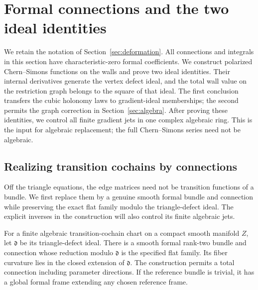 \section{Formal connections and the two ideal identities}
\label{sec:connections}

We retain the notation of Section~\ref{sec:deformation}.  All
connections and integrals in this section have characteristic-zero
formal coefficients.  We construct polarized Chern--Simons functions
on the walls and prove two ideal identities.  Their internal derivatives generate
the vertex defect ideal, and the total wall value on the restriction
graph belongs to the square of that ideal. The first conclusion
transfers the cubic holonomy laws to gradient-ideal memberships; the
second permits the graph correction in Section~\ref{sec:algebra}.
After proving these identities, we control all finite gradient jets
in one complex algebraic ring.  This is the input for algebraic
replacement; the full Chern--Simons series need not be algebraic.

\subsection{Realizing transition cochains by connections}

Off the triangle equations, the edge matrices need not be transition
functions of a bundle.  We first replace them by a genuine smooth
formal bundle and connection while preserving the exact flat family
modulo the triangle-defect ideal.  The explicit inverses in the
construction will also control its finite algebraic jets.

\begin{lemma}
\label{conn:image-bundle}
For a finite algebraic transition-cochain chart on a compact smooth
manifold \(Z\), let \(\mathfrak d\) be its triangle-defect ideal.
There is a smooth formal rank-two bundle and connection whose
reduction modulo \(\mathfrak d\) is the specified flat family.
Its fiber curvature lies in the closed extension of \(\mathfrak d\).
The construction permits a total connection including parameter
directions.  If the reference bundle is trivial, it has a global
formal frame extending any chosen reference frame.
\end{lemma}

